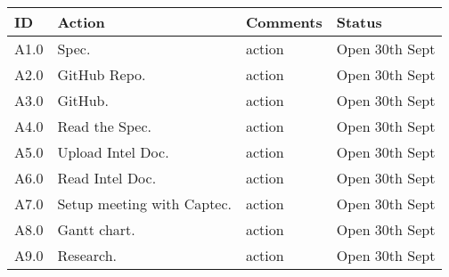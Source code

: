 \documentclass{elec6049Report}     %
\begin{document}
\begin{center}
\begin{longtable}{| p{} | >{\raggedright\arraybackslash}p{} |  p{} | >{\raggedright\arraybackslash}p{}|} \hline
\textbf{ID} & \textbf{Action} & \textbf{Comments} & \textbf{Status} \\ \hline
\endhead
A1.0	&	 Spec.	&	action 	& Open 30th Sept \\ \hline
A2.0	&	GitHub Repo.	&	action	&	Open 30th Sept \\ \hline
A3.0	&	GitHub.		&	action	&	Open 30th Sept	\\ \hline
A4.0	&	Read the Spec.	&	action	&	Open 30th Sept \\ \hline
A5.0	&	Upload Intel Doc.	&	action	&	Open 30th Sept \\ \hline
A6.0	&	Read Intel Doc.	&	action	&	Open 30th Sept \\ \hline
A7.0	&	Setup meeting with Captec.	&	action	&	Open 30th Sept \\ \hline
A8.0	&	Gantt chart.	&	action	&	Open 30th Sept	\\ \hline
A9.0	&	Research.&	action  &	Open 30th Sept	\\ \hline	
\end{longtable}
\end{center}


\clearpage


\end{document}

